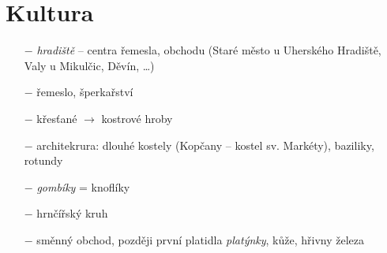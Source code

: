 \documentclass{article}
\begin{document}
\section*{Kultura}
\begin{itemize}
    \vspace{-0.5em}
    \setlength\itemsep{0.15em}
    \item[$-$] \textit{hradiště} -- centra řemesla, obchodu (Staré město u Uherského Hradiště, Valy u Mikulčic, Děvín, \dots)
    \item[$-$] řemeslo, šperkařství
    \item[$-$] křesťané $\rightarrow$ kostrové hroby
    \item[$-$] architekrura: dlouhé kostely (Kopčany -- kostel sv. Markéty), baziliky, rotundy
    \item[$-$] \textit{gombíky} = knoflíky
    \item[$-$] hrnčířský kruh
    \item[$-$] směnný obchod, později první platidla \textit{platýnky}, kůže, hřivny železa
\end{itemize}
\end{document}
